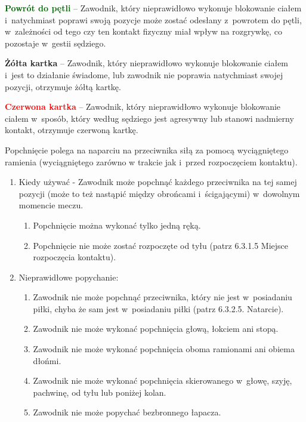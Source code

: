 \documentclass[12pt,a4paper]{article}
\renewcommand{\paragraph}[1]{
  \oldparagraph{#1}%
  \leftskip2.8cm
}
\newcommand\redcard[1]{\bgroup\textcolor{red}{\textbf{#1}}}
\newcommand\yellowcard[1]{\bgroup\textcolor{darkyellow}{\textbf{#1}}}
\newcommand\other[1]{\bgroup\textcolor{darkgreen}{\textbf{#1}}}
\begin{document}
\other{Powrót do pętli} -- Zawodnik, który nieprawidłowo wykonuje
blokowanie ciałem i~natychmiast poprawi swoją pozycje może zostać
odesłany z~powrotem do pętli, w~zależności od tego czy ten kontakt
fizyczny miał wpływ na rozgrywkę, co pozostaje w~gestii sędziego.

\yellowcard{Żółta kartka} -- Zawodnik, który nieprawidłowo wykonuje blokowanie
ciałem i~jest to działanie świadome, lub zawodnik nie poprawia
natychmiast swojej pozycji, otrzymuje żółtą kartkę.

\redcard{Czerwona kartka} -- Zawodnik, który nieprawidłowo wykonuje
blokowanie ciałem w~sposób, który według sędziego jest agresywny lub
stanowi nadmierny kontakt, otrzymuje czerwoną kartkę.

\paragraph{Popychanie}
Popchnięcie polega na naparciu na
przeciwnika siłą za pomocą wyciągniętego ramienia (wyciągniętego zarówno
w trakcie jak i~przed rozpoczęciem kontaktu).

\begin{enumerate}
	\item
	      Kiedy używać - Zawodnik może popchnąć każdego przeciwnika na tej samej
	      pozycji (może to też nastąpić między obrońcami i~ścigającymi) w~dowolnym momencie meczu.

	      \begin{enumerate}
		      \item
		            Popchnięcie można wykonać tylko jedną ręką.
		      \item
		            Popchnięcie nie może zostać rozpoczęte od tyłu (patrz 6.3.1.5
		            Miejsce rozpoczęcia kontaktu).
	      \end{enumerate}
	\item
	      Nieprawidłowe popychanie:

	      \begin{enumerate}
		      \item
		            Zawodnik nie może popchnąć przeciwnika, który nie jest w~posiadaniu
		            piłki, chyba że sam jest w~posiadaniu piłki (patrz 6.3.2.5.
		            Natarcie).
		      \item
		            Zawodnik nie może wykonać popchnięcia głową, łokciem ani stopą.
		      \item
		            Zawodnik nie może wykonać popchnięcia oboma ramionami ani obiema
		            dłońmi.
		      \item
		            Zawodnik nie może wykonać popchnięcia skierowanego w~głowę, szyję,
		            pachwinę, od tyłu lub poniżej kolan.
		      \item
		            Zawodnik nie może popychać bezbronnego łapacza.
	      \end{enumerate}
\end{enumerate}
\end{document}
